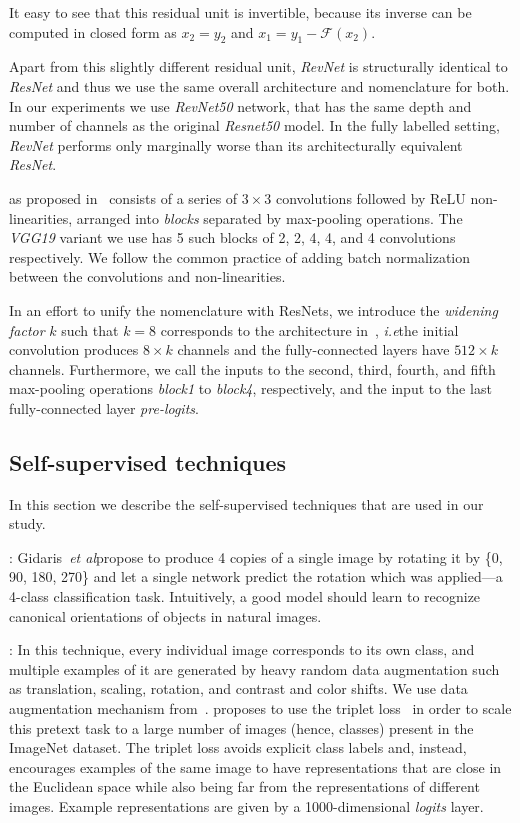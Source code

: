 \documentclass[10pt,twocolumn,letterpaper]{article}
\newcommand{\PAR}[1]{\vskip4pt \noindent {\bf #1~}}
\def\ie{\emph{i.e}\onedot} \def\Ie{\emph{I.e}\onedot}
\def\etal{\emph{et al}\onedot}
\begin{document}
It easy to see that this residual unit is invertible, because its inverse can be computed in closed form as
$x_2 = y_2$ and $x_1 = y_1 - \mathcal{F}(x_2)$.


Apart from this slightly different residual unit, \emph{RevNet} is structurally identical to \emph{ResNet} and thus we use the same overall architecture and nomenclature for both.
In our experiments we use \emph{RevNet50} network, that has the same depth and number of channels as the
original \emph{Resnet50} model.
In the fully labelled setting, \emph{RevNet} performs only marginally worse than its architecturally equivalent \emph{ResNet}.

\PAR{VGG} as proposed in~\cite{simonyan2014very} consists of a series of $3\times3$ convolutions followed by ReLU non-linearities, arranged into \emph{blocks} separated by max-pooling operations.
The \emph{VGG19} variant we use has 5 such blocks of 2, 2, 4, 4, and 4 convolutions respectively.
We follow the common practice of adding batch normalization between the convolutions and non-linearities.


In an effort to unify the nomenclature with ResNets, we introduce the \emph{widening factor} $k$ such that $k=8$ corresponds to the architecture in~\cite{simonyan2014very}, \ie the initial convolution produces $8\times k$ channels and the fully-connected layers have $512\times k$ channels.
Furthermore, we call the inputs to the second, third, fourth, and fifth max-pooling operations \emph{block1} to \emph{block4}, respectively, and the input to the last fully-connected layer \emph{pre-logits}.


\subsection{Self-supervised techniques}\label{subsec:methods}

In this section we describe the self-supervised techniques that are used in our study.

\PAR{Rotation}\cite{gidaris2018unsupervised}: Gidaris~\etal propose to produce 4 copies of a single image by rotating it by \{0\degree, 90\degree, 180\degree, 270\degree\} and let a single network predict the rotation which was applied---a 4-class classification task.
Intuitively, a good model should learn to recognize canonical orientations of objects in natural images.

\PAR{Exemplar}\cite{dosovitskiy2014exemplar}:
In this technique, every individual image corresponds to its own class, and multiple examples of it are generated by heavy random data augmentation such as translation, scaling, rotation, and contrast and color shifts. We use data augmentation mechanism from~\cite{szegedy2015going}.
\cite{doersch2017multi} proposes to use the triplet loss~\cite{schroff2015facenet,HermansBeyer2017Arxiv} in order to scale this pretext task to a large number of images (hence, classes) present in the ImageNet dataset.
The triplet loss avoids explicit class labels and, instead, encourages examples of the same image to have representations that are close in the Euclidean space while also being far from the representations of different images.
Example representations are given by a 1000-dimensional \emph{logits} layer.
\end{document}
